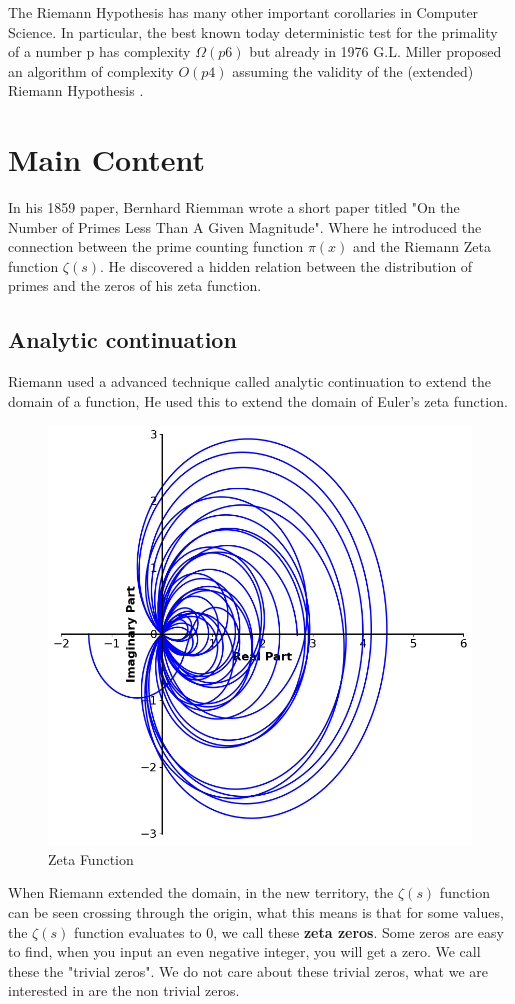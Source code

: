 \documentclass[12pt]{amsart} %
\theoremstyle{definition}
\theoremstyle{remark}
\numberwithin{equation}{section}
\begin{document}
The Riemann Hypothesis has many other important corollaries in Computer Science. In particular, the best known today deterministic test for the primality of a number p has complexity
$\Omega (p6)$ but already in 1976 G.L. Miller proposed an algorithm of complexity $O(p4)$ assuming the validity of the (extended) Riemann Hypothesis \cite{MATIYASEVICH2020257}.



\section{Main Content}
In his 1859 paper, Bernhard Riemman wrote a short paper titled "On the Number of Primes Less Than A Given Magnitude". Where he introduced the connection between the prime counting function $\pi(x) $ and the Riemann Zeta function $\zeta(s)$. He discovered a hidden relation between the distribution of primes and the zeros of his zeta function.
 


\subsection{Analytic continuation}
Riemann used a advanced technique called analytic continuation to extend the domain of a function, He used this to extend the domain of Euler's zeta function.

\begin{figure}[h!]
    \centering
    \includegraphics[width=0.8\linewidth]{../Images/zetafunction}
    \caption{Zeta Function}
    \label{fig:euler_zeta}
\end{figure}
When Riemann extended the domain, in the new territory, the $\zeta(s)$ function can be seen crossing through the origin, what this means is that for some values, the $\zeta(s)$ function evaluates to 0, we call these \textbf{zeta zeros}. Some zeros are easy to find, when you input an even negative integer, you will get a zero. We call these the "trivial zeros". We do not care about these trivial zeros, what we are interested in are the non trivial zeros.
\end{document}
